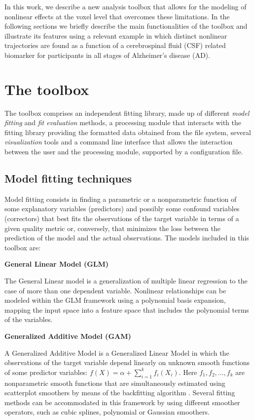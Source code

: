 \documentclass{article}
\begin{document}
In this work, we describe a new analysis toolbox that allows for the modeling of nonlinear effects at the voxel level that overcomes these limitations. In the following sections we briefly describe the main functionalities of the toolbox and illustrate its features using a relevant example in which distinct nonlinear trajectories are found as a function of a cerebrospinal fluid (CSF) related biomarker for participants in all stages of Alzheimer's disease (AD).


\section{The toolbox}
\label{toolbox}

The toolbox comprises an independent fitting library, made up of different \textit{model fitting} and \textit{fit evaluation} methods, a processing module that interacts with the fitting library providing the formatted data obtained from the file system, several \textit{visualization} tools and a command line interface that allows the interaction between the user and the processing module, supported by a configuration file. 

\subsection{Model fitting techniques}

Model fitting consists in finding a parametric or a nonparametric function of some explanatory variables (predictors) and possibly some confound variables (correctors) that best fits the observations of the target variable in terms of a given quality metric or, conversely, that minimizes the loss between the prediction of the model and the actual observations. The models included in this toolbox are:

\textbf{General Linear Model (GLM)} 

The General Linear model is a generalization of multiple linear regression to the case of more than one dependent variable. Nonlinear relationships can be modeled within the GLM framework using a polynomial basis expansion, mapping the input space into a feature space that includes the polynomial terms of the variables.

\textbf{Generalized Additive Model (GAM)} 

A Generalized Additive Model \cite{gam_Hastie_1990} is a Generalized Linear Model in which the observations of the target variable depend linearly on unknown smooth functions of some predictor variables: $ f(X) = \alpha + \sum_{i=1}^{k} f_i(X_i)$. Here $f_1, f_2, ..., f_k$ are nonparametric smooth functions that are simultaneously estimated using scatterplot smoothers by means of the backfitting algorithm \cite{breiman_backfit}. Several fitting methods can be accommodated in this framework by using different smoother operators, such as cubic splines, polynomial or Gaussian smoothers. 
\end{document}

